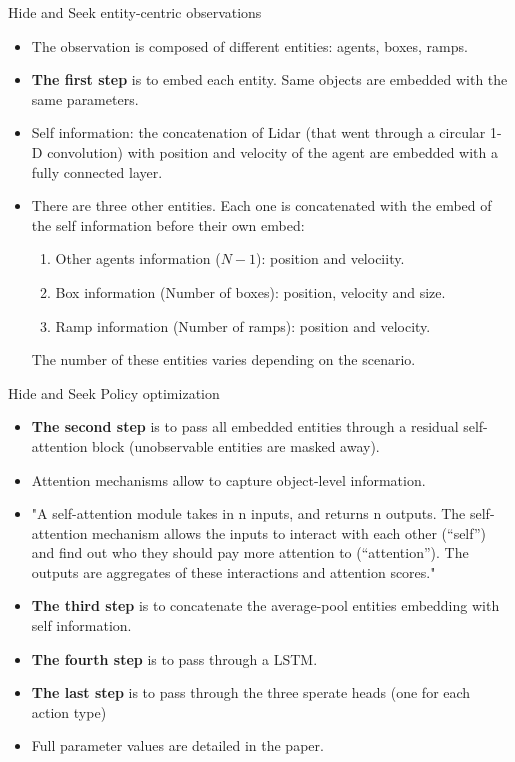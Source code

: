 \documentclass[9pt, hyperref={pdfusetitle,colorlinks=true,allcolors=DarkBlue}]{beamer}
\begin{document}
\begin{frame}{Hide and Seek entity-centric observations}
\begin{itemize}
    \item The observation is composed of different entities: agents, boxes, ramps.
    \item \textbf{The first step} is to embed each entity. Same objects are embedded with the same parameters.
    \item Self information: the concatenation of Lidar (that went through a circular 1-D convolution) with position and velocity of the agent are embedded with a fully connected layer.
    \item There are three other entities. Each one is concatenated with the embed of the self information before their own embed:
    \begin{enumerate}
        \item Other agents information ($N-1$): position and velociity.
        \item Box information (Number of boxes): position, velocity and size.
        \item Ramp information (Number of ramps): position and velocity.
    \end{enumerate}
    The number of these entities varies depending on the scenario.
\end{itemize}{}
\end{frame}{}

\begin{frame}{Hide and Seek Policy optimization}
\begin{itemize}
    \item \textbf{The second step} is to pass all embedded entities through a residual self-attention block (unobservable entities are masked away).
    \item Attention mechanisms allow to capture object-level information.
    \item "A self-attention module takes in n inputs, and returns n outputs. The self-attention mechanism allows the inputs to interact with each other (“self”) and find out who they should pay more attention to (“attention”). The outputs are aggregates of these interactions and attention scores."
    \item \textbf{The third step} is to concatenate the average-pool entities embedding with self information.
    \item \textbf{The fourth step} is to pass through a LSTM.
    \item \textbf{The last step} is to pass through the three sperate heads (one for each action type)
    \item Full parameter values are detailed in the paper.
\end{itemize}{}
\end{frame}{}
\end{document}
